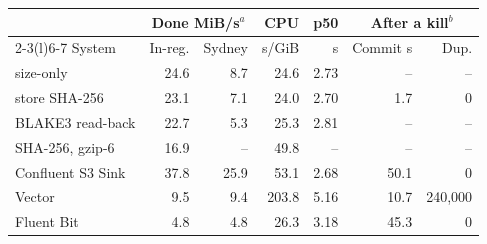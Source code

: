 
\begin{tabular}{@{}lrrrrrr@{}}
\toprule
& \multicolumn{2}{c}{Done MiB/s$^a$} & CPU & p50 & \multicolumn{2}{c}{After a kill$^b$} \\ \cmidrule(lr){2-3}\cmidrule(l){6-7}
System & In-reg. & Sydney & s/GiB & s & Commit s & Dup. \\
\midrule
\sysname{} size-only & 24.6 & 8.7 & 24.6 & 2.73 & -- & -- \\
\sysname{} store SHA-256 & 23.1 & 7.1 & 24.0 & 2.70 & 1.7 & 0 \\
\sysname{} BLAKE3 read-back & 22.7 & 5.3 & 25.3 & 2.81 & -- & -- \\
\sysname{} SHA-256, gzip-6 & 16.9 & -- & 49.8 & -- & -- & -- \\
\addlinespace[1pt]
Confluent S3 Sink & 37.8 & 25.9 & 53.1 & 2.68 & 50.1 & 0 \\
Vector & 9.5 & 9.4 & 203.8 & 5.16 & 10.7 & 240{,}000 \\
Fluent Bit & 4.8 & 4.8 & 26.3 & 3.18 & 45.3 & 0 \\
\bottomrule
\end{tabular}
